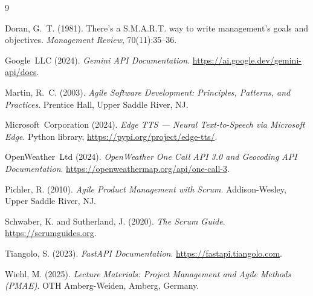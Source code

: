 \documentclass[11pt, a4paper]{article}
\begin{document}

\begin{thebibliography}{9}

Doran, G.~T. (1981).
\newblock There's a S.M.A.R.T. way to write management's goals and objectives.
\newblock \textit{Management Review}, 70(11):35--36.

Google~LLC (2024).
\newblock \textit{Gemini API Documentation}.
\newblock \url{https://ai.google.dev/gemini-api/docs}.

Martin, R.~C. (2003).
\newblock \textit{Agile Software Development: Principles, Patterns, and Practices}.
\newblock Prentice Hall, Upper Saddle River, NJ.

Microsoft~Corporation (2024).
\newblock \textit{Edge TTS — Neural Text-to-Speech via Microsoft Edge}.
\newblock Python library, \url{https://pypi.org/project/edge-tts/}.

OpenWeather~Ltd (2024).
\newblock \textit{OpenWeather One Call API 3.0 and Geocoding API Documentation}.
\newblock \url{https://openweathermap.org/api/one-call-3}.

Pichler, R. (2010).
\newblock \textit{Agile Product Management with Scrum}.
\newblock Addison-Wesley, Upper Saddle River, NJ.

Schwaber, K. and Sutherland, J. (2020).
\newblock \textit{The Scrum Guide}.
\newblock \url{https://scrumguides.org}.

Tiangolo, S. (2023).
\newblock \textit{FastAPI Documentation}.
\newblock \url{https://fastapi.tiangolo.com}.

Wiehl, M. (2025).
\newblock \textit{Lecture Materials: Project Management and Agile Methods (PMAE)}.
\newblock OTH Amberg-Weiden, Amberg, Germany.

\end{thebibliography}
\end{document}
